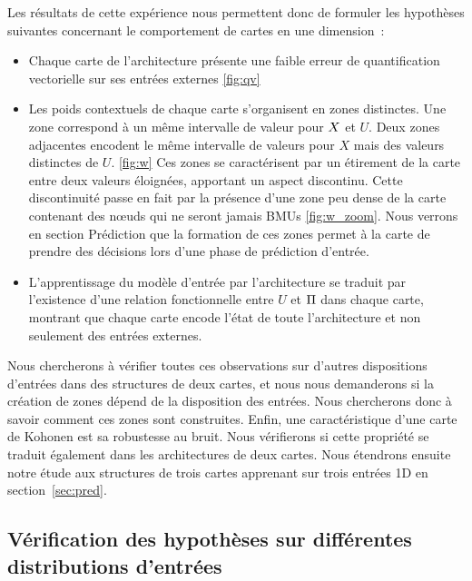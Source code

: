\documentclass[../main]{subfiles}
\begin{document}
Les résultats de cette expérience nous permettent donc de formuler les hypothèses suivantes concernant le comportement de cartes en une dimension~:

\begin{itemize}
	\item Chaque carte de l'architecture présente une faible erreur de quantification vectorielle sur ses entrées externes \ref{fig:qv}
	\item Les poids contextuels de chaque carte s'organisent en zones distinctes. Une zone correspond à un même intervalle de valeur pour $X$ et $U$. Deux zones adjacentes encodent le même intervalle de valeurs pour $X$ mais des valeurs distinctes de $U$. \ref{fig:w} Ces zones se caractérisent par un étirement de la carte entre deux valeurs éloignées, apportant un aspect discontinu. Cette discontinuité passe en fait par la présence d'une zone peu dense de la carte contenant des n\oe{}uds qui ne seront jamais BMUs \ref{fig:w_zoom}. Nous verrons en section Prédiction que la formation de ces zones permet à la carte de prendre des décisions lors d'une phase de prédiction d'entrée.
	\item L'apprentissage du modèle d'entrée par l'architecture se traduit par l'existence d'une relation fonctionnelle entre $U$ et $\Pi$ dans chaque carte, montrant que chaque carte encode l'état de toute l'architecture et non seulement des entrées externes.
\end{itemize}

Nous chercherons à vérifier toutes ces observations sur d'autres dispositions d'entrées dans des structures de deux cartes, et nous nous demanderons si la création de zones dépend de la disposition des entrées. Nous chercherons donc à savoir comment ces zones sont construites. Enfin, une caractéristique d'une carte de Kohonen est sa robustesse au bruit. Nous vérifierons si cette propriété se traduit également dans les architectures de deux cartes.
Nous étendrons ensuite notre étude aux structures de trois cartes apprenant sur trois entrées 1D en section~\ref{sec:pred}.





\subsection{Vérification des hypothèses sur différentes distributions d'entrées}
\end{document}
